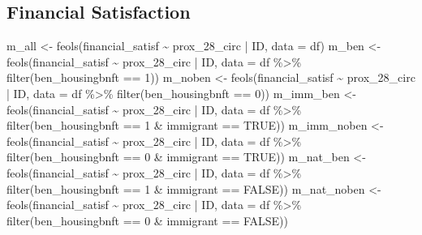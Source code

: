 \documentclass[
  letterpaper,
  DIV=11,
  numbers=noendperiod]{scrartcl}
\newenvironment{Shaded}{\begin{snugshade}}{\end{snugshade}}
\newcommand{\AttributeTok}[1]{\textcolor[rgb]{0.40,0.45,0.13}{#1}}
\newcommand{\ConstantTok}[1]{\textcolor[rgb]{0.56,0.35,0.01}{#1}}
\newcommand{\DecValTok}[1]{\textcolor[rgb]{0.68,0.00,0.00}{#1}}
\newcommand{\FunctionTok}[1]{\textcolor[rgb]{0.28,0.35,0.67}{#1}}
\newcommand{\NormalTok}[1]{\textcolor[rgb]{0.00,0.23,0.31}{#1}}
\newcommand{\OtherTok}[1]{\textcolor[rgb]{0.00,0.23,0.31}{#1}}
\newcommand{\SpecialCharTok}[1]{\textcolor[rgb]{0.37,0.37,0.37}{#1}}
\begin{document}
\hypertarget{financial-satisfaction}{%
\subsection{Financial Satisfaction}\label{financial-satisfaction}}

\begin{Shaded}
\begin{Highlighting}[]
\NormalTok{m\_all }\OtherTok{\textless{}{-}} \FunctionTok{feols}\NormalTok{(financial\_satisf }\SpecialCharTok{\textasciitilde{}}\NormalTok{ prox\_28\_circ }\SpecialCharTok{|}\NormalTok{ ID, }\AttributeTok{data =}\NormalTok{ df)}
\NormalTok{m\_ben }\OtherTok{\textless{}{-}} \FunctionTok{feols}\NormalTok{(financial\_satisf }\SpecialCharTok{\textasciitilde{}}\NormalTok{ prox\_28\_circ }\SpecialCharTok{|}\NormalTok{ ID,}
               \AttributeTok{data =}\NormalTok{ df }\SpecialCharTok{\%\textgreater{}\%} \FunctionTok{filter}\NormalTok{(ben\_housingbnft }\SpecialCharTok{==} \DecValTok{1}\NormalTok{))}
\NormalTok{m\_noben }\OtherTok{\textless{}{-}} \FunctionTok{feols}\NormalTok{(financial\_satisf }\SpecialCharTok{\textasciitilde{}}\NormalTok{ prox\_28\_circ }\SpecialCharTok{|}\NormalTok{ ID,}
                 \AttributeTok{data =}\NormalTok{ df }\SpecialCharTok{\%\textgreater{}\%} \FunctionTok{filter}\NormalTok{(ben\_housingbnft }\SpecialCharTok{==} \DecValTok{0}\NormalTok{))}
\NormalTok{m\_imm\_ben }\OtherTok{\textless{}{-}} \FunctionTok{feols}\NormalTok{(financial\_satisf }\SpecialCharTok{\textasciitilde{}}\NormalTok{ prox\_28\_circ }\SpecialCharTok{|}\NormalTok{ ID,}
                   \AttributeTok{data =}\NormalTok{ df }\SpecialCharTok{\%\textgreater{}\%} \FunctionTok{filter}\NormalTok{(ben\_housingbnft }\SpecialCharTok{==} \DecValTok{1} \SpecialCharTok{\&}\NormalTok{ immigrant }\SpecialCharTok{==} \ConstantTok{TRUE}\NormalTok{))}
\NormalTok{m\_imm\_noben }\OtherTok{\textless{}{-}} \FunctionTok{feols}\NormalTok{(financial\_satisf }\SpecialCharTok{\textasciitilde{}}\NormalTok{ prox\_28\_circ }\SpecialCharTok{|}\NormalTok{ ID,}
                     \AttributeTok{data =}\NormalTok{ df }\SpecialCharTok{\%\textgreater{}\%} \FunctionTok{filter}\NormalTok{(ben\_housingbnft }\SpecialCharTok{==} \DecValTok{0} \SpecialCharTok{\&}\NormalTok{ immigrant }\SpecialCharTok{==} \ConstantTok{TRUE}\NormalTok{))}
\NormalTok{m\_nat\_ben }\OtherTok{\textless{}{-}} \FunctionTok{feols}\NormalTok{(financial\_satisf }\SpecialCharTok{\textasciitilde{}}\NormalTok{ prox\_28\_circ }\SpecialCharTok{|}\NormalTok{ ID,}
                   \AttributeTok{data =}\NormalTok{ df }\SpecialCharTok{\%\textgreater{}\%} \FunctionTok{filter}\NormalTok{(ben\_housingbnft }\SpecialCharTok{==} \DecValTok{1} \SpecialCharTok{\&}\NormalTok{ immigrant }\SpecialCharTok{==} \ConstantTok{FALSE}\NormalTok{))}
\NormalTok{m\_nat\_noben }\OtherTok{\textless{}{-}} \FunctionTok{feols}\NormalTok{(financial\_satisf }\SpecialCharTok{\textasciitilde{}}\NormalTok{ prox\_28\_circ }\SpecialCharTok{|}\NormalTok{ ID,}
                     \AttributeTok{data =}\NormalTok{ df }\SpecialCharTok{\%\textgreater{}\%} \FunctionTok{filter}\NormalTok{(ben\_housingbnft }\SpecialCharTok{==} \DecValTok{0} \SpecialCharTok{\&}\NormalTok{ immigrant }\SpecialCharTok{==} \ConstantTok{FALSE}\NormalTok{))}


\end{Highlighting}
\end{Shaded}
\end{document}
